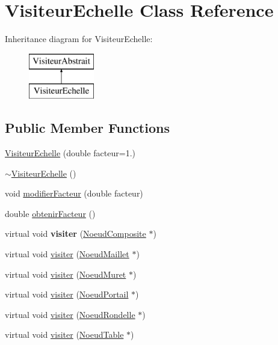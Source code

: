 \hypertarget{class_visiteur_echelle}{}\section{Visiteur\+Echelle Class Reference}
\label{class_visiteur_echelle}
Inheritance diagram for Visiteur\+Echelle\+:\begin{figure}[H]
\begin{center}
\leavevmode
\includegraphics[height=2.000000cm]{class_visiteur_echelle}
\end{center}
\end{figure}
\subsection*{Public Member Functions}
\begin{DoxyCompactItemize}
\item 
\hyperlink{group__inf2990_gaddf0654645ae3598073fb8ec209c62ff}{Visiteur\+Echelle} (double facteur=1.)
\item 
\hyperlink{group__inf2990_gaefd75264dd515e96588720d78698cb43}{$\sim$\+Visiteur\+Echelle} ()
\item 
void \hyperlink{group__inf2990_ga499407dd8991f64b30fc120017ab4090}{modifier\+Facteur} (double facteur)
\item 
double \hyperlink{group__inf2990_gae9b1f432611d822d61c595eaff646009}{obtenir\+Facteur} ()
\item 
virtual void {\bfseries visiter} (\hyperlink{class_noeud_composite}{Noeud\+Composite} $\ast$)
\item 
virtual void \hyperlink{group__inf2990_ga5cde1fb2bc7754fb7f9ce9943deafbc2}{visiter} (\hyperlink{class_noeud_maillet}{Noeud\+Maillet} $\ast$)
\item 
virtual void \hyperlink{group__inf2990_ga66c3727bc8cb483ce19c66a933a1e171}{visiter} (\hyperlink{class_noeud_muret}{Noeud\+Muret} $\ast$)
\item 
virtual void \hyperlink{group__inf2990_gab0abc0f847cb7abda9f002229e88829f}{visiter} (\hyperlink{class_noeud_portail}{Noeud\+Portail} $\ast$)
\item 
virtual void \hyperlink{group__inf2990_gadb69bccd2cfe72d73f860e3a4eabee7d}{visiter} (\hyperlink{class_noeud_rondelle}{Noeud\+Rondelle} $\ast$)
\item 
virtual void \hyperlink{group__inf2990_ga727e8d9127b63b580d4d3297a79332f1}{visiter} (\hyperlink{class_noeud_table}{Noeud\+Table} $\ast$)
\end{DoxyCompactItemize}
